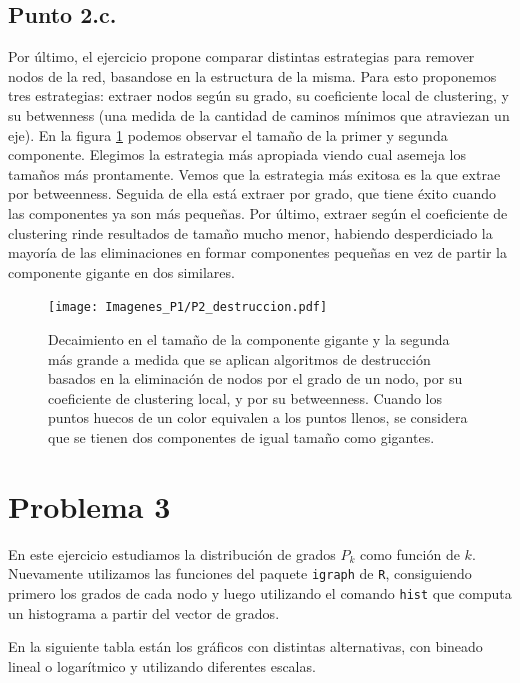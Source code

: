 \documentclass{article}
\begin{document}
\subsection{Punto 2.c.}
Por último, el ejercicio propone comparar distintas estrategias para remover nodos de la red, basandose en la estructura de la misma. Para esto proponemos tres estrategias: extraer nodos según su grado, su coeficiente local de clustering, y su betwenness (una medida de la cantidad de caminos mínimos que atraviezan un eje). En la figura \ref{rupturas} podemos observar el tamaño de la primer y segunda componente. Elegimos la estrategia más apropiada viendo cual asemeja los tamaños más prontamente. Vemos que la estrategia más exitosa es la que extrae por betweenness. Seguida de ella está extraer por grado, que tiene éxito cuando las componentes ya son más pequeñas. Por último, extraer según el coeficiente de clustering rinde resultados de tamaño mucho menor, habiendo desperdiciado la mayoría de las eliminaciones en formar componentes pequeñas en vez de partir la componente gigante en dos similares.

\begin{figure}[!htb]
   \centering
   \begin{minipage}{0.6\textwidth}
    \centering
    \texttt{[image: Imagenes\_P1/P2\_destruccion.pdf]}
    \caption{Decaimiento en el tamaño de la componente gigante y la segunda más grande a medida que se aplican algoritmos de destrucción basados en la eliminación de nodos por el grado de un nodo, por su coeficiente de clustering local, y por su betweenness. Cuando los puntos huecos de un color equivalen a los puntos llenos, se considera que se tienen dos componentes de igual tamaño como gigantes.}
    \label{rupturas}
   \end{minipage}
\end{figure}

\section{Problema 3}
En este ejercicio estudiamos la distribución de grados $P_k$ como función de $k$. Nuevamente utilizamos las funciones del paquete \texttt{igraph} de \texttt{R}, consiguiendo primero los grados de cada nodo y luego utilizando el comando \texttt{hist} 	que computa un histograma a partir del vector de grados.

En la siguiente tabla están los gráficos con distintas alternativas, con bineado lineal o logarítmico y utilizando diferentes escalas.
\end{document}
